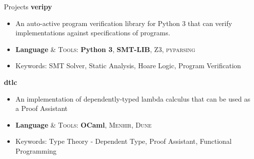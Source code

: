 \documentclass{resume}
\begin{document}
\begin{rSection}{Projects}
		\textbf{veripy} %
		\vspace{-5pt}

		\begin{itemize}
			\setlength{\itemsep}{1pt}
            \setlength{\parskip}{0pt}
			\setlength{\parsep}{0pt}
			\item An auto-active program verification library for Python 3 that can verify implementations against specifications of programs.
			\item \textbf{Language} \& \textsc{Tools}: \textbf{Python 3}, \textbf{SMT-LIB}, \textsc{Z3}, \textsc{pyparsing}
			\item Keywords: SMT Solver, Static Analysis, Hoare Logic, Program Verification
		\end{itemize}

		\textbf{dtlc} %
		\vspace{-5pt}

		\begin{itemize}
			\setlength{\itemsep}{1pt}
            \setlength{\parskip}{0pt}
			\setlength{\parsep}{0pt}
			\item An implementation of dependently-typed lambda calculus that can be used as a Proof Assistant 
			\item \textbf{Language} \& \textsc{Tools}: \textbf{OCaml}, \textsc{Menhir}, \textsc{Dune}
			\item Keywords: Type Theory - Dependent Type, Proof Assistant, Functional Programming
		\end{itemize}





	\end{rSection}
	\vspace{-5pt}
\end{document}
